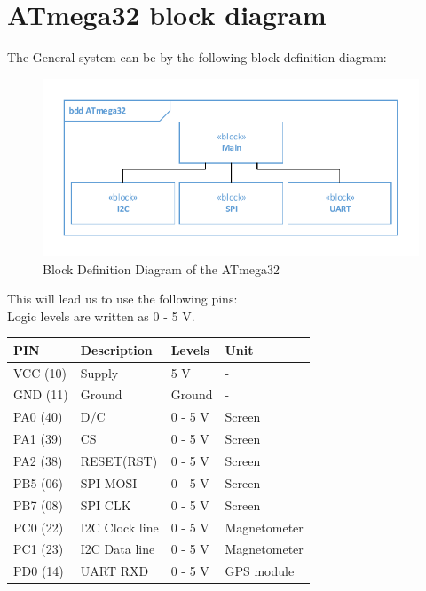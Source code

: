 \section{ATmega32 block diagram}
The General system can be by the following block definition diagram:\\
\begin{figure}[H]
	\centering
	\includegraphics[width=.8\textwidth]{billeder/atmegaBDD}
	\caption{Block Definition Diagram of the ATmega32}
	\label{bdd:system}
\end{figure}

This will lead us to use the following pins:\\
Logic levels are written as 0 - 5 V.\\

\begin{table}[H]
\centering
    \begin{tabular}{|l|l|l|l|}
    \hline
    PIN 		& Description    & Levels 	& Unit  \\ \hline
    VCC (10) 	& Supply         & 5 V    	& -		\\ \hline
    GND (11) 	& Ground         & Ground  	& -		\\ \hline
    PA0 (40)	& D/C			 & 0 - 5 V	& Screen \\ \hline
    PA1 (39)	& CS			 & 0 - 5 V  & Screen \\ \hline
    PA2 (38)	& RESET(RST)	 & 0 - 5 V  & Screen \\ \hline
    PB5	(06)	& SPI MOSI		 & 0 - 5 V  & Screen \\ \hline
    PB7 (08)	& SPI CLK		 & 0 - 5 V  & Screen \\ \hline
    PC0 (22) 	& I2C Clock line & 0 - 5 V 	& Magnetometer 	\\ \hline
    PC1 (23) 	& I2C Data line  & 0 - 5 V 	& Magnetometer		\\ \hline
    PD0 (14)	& UART RXD		 & 0 - 5 V	& GPS module \\ \hline
    \end{tabular}
\end{table}

